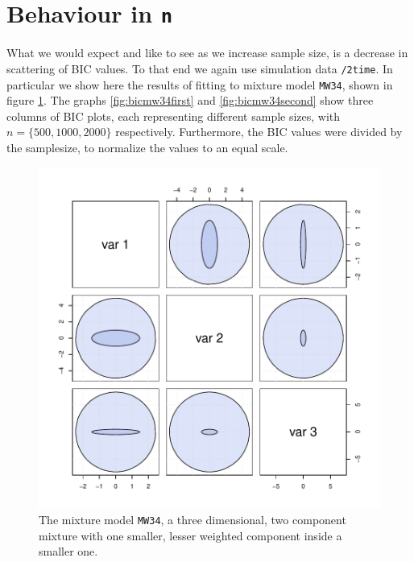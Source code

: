 \clearpage

\section{Behaviour in {\tt n}}
\label{sec:ben}

What we would expect and like to see as we increase sample size, is a decrease
in scattering of BIC values. To that end we again use simulation data 
{\tt /2time}. In particular we show here the results of fitting to mixture 
model {\tt MW34}, shown in figure \ref{fig:MW34}. The graphs 
\ref{fig:bicmw34first} and \ref{fig:bicmw34second} show three columns
of BIC plots, each representing different sample sizes, with 
$n = \{500, 1000, 2000\}$ respectively. Furthermore, the BIC values were 
divided by the samplesize, to normalize the values to an equal scale.

\begin{figure}[h]
    \begin{Rgraph}[0.9]
\includegraphics{chapter3-figMW34}
    \caption{The mixture model {\tt MW34}, a three dimensional, two component
             mixture with one smaller, lesser weighted component inside a 
             smaller one.}
    \label{fig:MW34}
    \end{Rgraph}
\end{figure}


